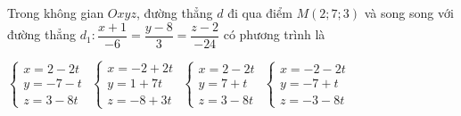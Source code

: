 \documentclass[12pt,a4paper]{article}
\begin{document}
\begin{ex}
 Trong không gian ${Oxyz}$, đường thẳng ${d}$ đi qua điểm ${M(2;7;3)}$ và song song với đường thẳng $d_1:\dfrac{x + 1}{-6}=\dfrac{y - 8}{3}=\dfrac{z - 2}{-24}$ có phương trình là
 
\choice
{ $\left\{ \begin{array}{l}x = 2-2t\\ y = -7-t\\z = 3-8t\end{array} \right.$ }
   { $\left\{ \begin{array}{l}x = -2+2t\\ y = 1+7t\\z = -8+3t\end{array} \right.$ }
     { \True $\left\{ \begin{array}{l}x = 2-2t\\ y = 7+t\\z = 3-8t\end{array} \right.$ }
    { $\left\{ \begin{array}{l}x = -2-2t\\ y = -7+t\\z = -3-8t\end{array} \right.$ }
\end{ex}
\end{document}
